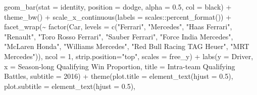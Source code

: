 \documentclass[
]{book}
\newenvironment{Shaded}{\begin{snugshade}}{\end{snugshade}}
\newcommand{\AttributeTok}[1]{\textcolor[rgb]{0.77,0.63,0.00}{#1}}
\newcommand{\DecValTok}[1]{\textcolor[rgb]{0.00,0.00,0.81}{#1}}
\newcommand{\FloatTok}[1]{\textcolor[rgb]{0.00,0.00,0.81}{#1}}
\newcommand{\FunctionTok}[1]{\textcolor[rgb]{0.00,0.00,0.00}{#1}}
\newcommand{\NormalTok}[1]{#1}
\newcommand{\SpecialCharTok}[1]{\textcolor[rgb]{0.00,0.00,0.00}{#1}}
\newcommand{\StringTok}[1]{\textcolor[rgb]{0.31,0.60,0.02}{#1}}
\begin{document}
\begin{Shaded}
\begin{Highlighting}[]
  \FunctionTok{geom\_bar}\NormalTok{(}\AttributeTok{stat =} \StringTok{\textquotesingle{}identity\textquotesingle{}}\NormalTok{, }\AttributeTok{position =} \StringTok{\textquotesingle{}dodge\textquotesingle{}}\NormalTok{, }\AttributeTok{alpha =} \FloatTok{0.5}\NormalTok{, }\AttributeTok{col =} \StringTok{\textquotesingle{}black\textquotesingle{}}\NormalTok{) }\SpecialCharTok{+}
  \FunctionTok{theme\_bw}\NormalTok{() }\SpecialCharTok{+}
  \FunctionTok{scale\_x\_continuous}\NormalTok{(}\AttributeTok{labels =}\NormalTok{ scales}\SpecialCharTok{::}\FunctionTok{percent\_format}\NormalTok{()) }\SpecialCharTok{+}
  \FunctionTok{facet\_wrap}\NormalTok{(}\SpecialCharTok{\textasciitilde{}} \FunctionTok{factor}\NormalTok{(Car, }
                      \AttributeTok{levels =} \FunctionTok{c}\NormalTok{(}\StringTok{"Ferrari"}\NormalTok{,}
                                 \StringTok{"Mercedes"}\NormalTok{,}
                                 \StringTok{"Haas Ferrari"}\NormalTok{,}
                                 \StringTok{"Renault"}\NormalTok{,}
                                 \StringTok{"Toro Rosso Ferrari"}\NormalTok{,}
                                 \StringTok{"Sauber Ferrari"}\NormalTok{, }
                                 \StringTok{"Force India Mercedes"}\NormalTok{,}
                                 \StringTok{"McLaren Honda"}\NormalTok{,}
                                 \StringTok{"Williams Mercedes"}\NormalTok{,}
                                 \StringTok{"Red Bull Racing TAG Heuer"}\NormalTok{,}
                                \StringTok{"MRT Mercedes"}\NormalTok{)),}
             \AttributeTok{ncol =} \DecValTok{1}\NormalTok{, }\AttributeTok{strip.position=}\StringTok{"top"}\NormalTok{, }\AttributeTok{scales =} \StringTok{\textquotesingle{}free\_y\textquotesingle{}}\NormalTok{) }\SpecialCharTok{+}
  \FunctionTok{labs}\NormalTok{(}\AttributeTok{y =} \StringTok{\textquotesingle{}Driver\textquotesingle{}}\NormalTok{,}
       \AttributeTok{x =} \StringTok{\textquotesingle{}Season{-}long Qualifying Win Proportion\textquotesingle{}}\NormalTok{,}
       \AttributeTok{title =} \StringTok{\textquotesingle{}Intra{-}team Qualifying Battles\textquotesingle{}}\NormalTok{,}
       \AttributeTok{subtitle =} \StringTok{\textquotesingle{}2016\textquotesingle{}}\NormalTok{) }\SpecialCharTok{+}
  \FunctionTok{theme}\NormalTok{(}\AttributeTok{plot.title =} \FunctionTok{element\_text}\NormalTok{(}\AttributeTok{hjust =} \FloatTok{0.5}\NormalTok{),}
        \AttributeTok{plot.subtitle =} \FunctionTok{element\_text}\NormalTok{(}\AttributeTok{hjust =} \FloatTok{0.5}\NormalTok{),}

\end{Highlighting}
\end{Shaded}
\end{document}
